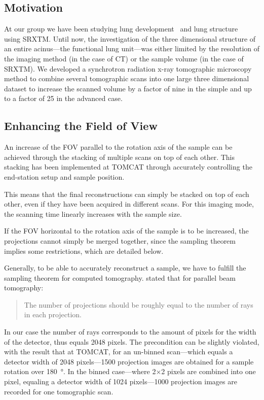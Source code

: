 \subsection{Motivation}
\label{subsec:motivation}
At our group we have been studying lung development~\cite{Schittny2008,Mund2008} and lung structure~\cite{Tsuda2008} using SRXTM. Until now, the investigation of the three dimensional structure of an entire acinus---the functional lung unit---was either limited by the resolution of the imaging method (in the case of \micro CT) or the sample volume (in the case of SRXTM). We developed a synchrotron radiation x-ray tomographic microscopy method to combine several tomographic scans into one large three dimensional dataset to increase the scanned volume by a factor of nine in the simple and up to a factor of 25 in the advanced case.

\subsection{Enhancing the Field of View}
\label{subsec:enhancing the field of view}
An increase of the FOV parallel to the rotation axis of the sample can be achieved through the stacking of multiple scans on top of each other. This stacking has been implemented at TOMCAT through accurately controlling the end-station setup and sample position.

This means that the final reconstructions can simply be stacked on top of each other, even if they have been acquired in different scans. For this imaging mode, the scanning time linearly increases with the sample size.

If the FOV horizontal to the rotation axis of the sample is to be increased, the projections cannot simply be merged together, since the sampling theorem implies some restrictions, which are detailed below.

Generally, to be able to accurately reconstruct a sample, we have to fulfill the sampling theorem for computed tomography. \citet{Kak2002} stated that for parallel beam tomography: \begin{quote} The number of projections should be roughly equal to the number of rays in each projection. \end{quote} In our case the number of rays corresponds to the amount of pixels for the width of the detector, thus equals 2048 pixels. The precondition can be slightly violated, with the result that at TOMCAT, for an un-binned scan---which equals a detector width of 2048 pixels---1500 projection images are obtained for a sample rotation over \SI{180}{\degree}. In the binned case---where 2\(\times\)2 pixels are combined into one pixel, equaling a detector width of 1024 pixels---1000 projection images are recorded for one tomographic scan.

